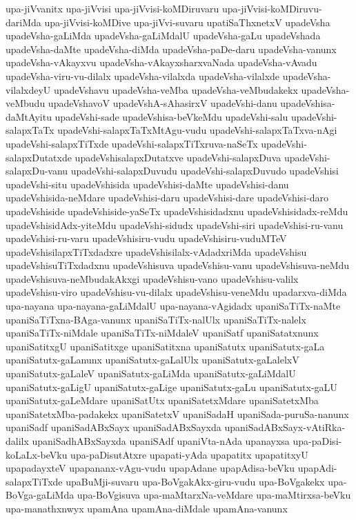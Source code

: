 {upa-jiVvanitx
upa-jiVvisi
upa-jiVvisi-koMDiruvaru
upa-jiVvisi-koMDiruvu-dariMda
upa-jiVvisi-koMDive
upa-jiVvi-suvaru
upatiSaThxnetxV
upadeVsha
upadeVsha-gaLiMda
upadeVsha-gaLiMdalU
upadeVsha-gaLu
upadeVshada
upadeVsha-daMte
upadeVsha-diMda
upadeVsha-paDe-daru
upadeVsha-vanunx
upadeVsha-vAkayxvu
upadeVsha-vAkayxsharxvaNada
upadeVsha-vAvadu
upadeVsha-viru-vu-dilalx
upadeVsha-vilalxda
upadeVsha-vilalxde
upadeVsha-vilalxdeyU
upadeVshavu
upadeVsha-veMba
upadeVsha-veMbudakekx
upadeVsha-veMbudu
upadeVshavoV
upadeVshA-sAhasirxV
upadeVshi-danu
upadeVshisa-daMtAyitu
upadeVshi-sade
upadeVshisa-beVkeMdu
upadeVshi-salu
upadeVshi-salapxTaTx
upadeVshi-salapxTaTxMtAgu-vudu
upadeVshi-salapxTaTxva-nAgi
upadeVshi-salapxTiTxde
upadeVshi-salapxTiTxruva-naSeTx
upadeVshi-salapxDutatxde
upadeVshisalapxDutatxve
upadeVshi-salapxDuva
upadeVshi-salapxDu-vanu
upadeVshi-salapxDuvudu
upadeVshi-salapxDuvudo
upadeVshisi
upadeVshi-situ
upadeVshisida
upadeVshisi-daMte
upadeVshisi-danu
upadeVshisida-neMdare
upadeVshisi-daru
upadeVshisi-dare
upadeVshisi-daro
upadeVshiside
upadeVshiside-yaSeTx
upadeVshisidadxnu
upadeVshisidadx-reMdu
upadeVshisidAdx-yiteMdu
upadeVshi-sidudx
upadeVshi-siri
upadeVshisi-ru-vanu
upadeVshisi-ru-varu
upadeVshisiru-vudu
upadeVshisiru-vuduMTeV
upadeVshisilapxTiTxdadxre
upadeVshisilalx-vAdadxriMda
upadeVshisu
upadeVshisuTiTxdadxnu
upadeVshisuva
upadeVshisu-vanu
upadeVshisuva-neMdu
upadeVshisuva-neMbudakAkxgi
upadeVshisu-vano
upadeVshisu-valilx
upadeVshisu-viro
upadeVshisu-vu-dilalx
upadeVshisu-veneMdu
upadarxva-diMda
upa-nayana
upa-nayana-gaLiMdalU
upa-nayana-vAgidadx
upaniSaTiTx-naMte
upaniSaTiTxna-BAga-vanunx
upaniSaTiTx-nalUlx
upaniSaTiTx-nalelx
upaniSaTiTx-niMdale
upaniSaTiTx-niMdaleV
upaniSatf
upaniSatatxnunx
upaniSatitxgU
upaniSatitxge
upaniSatitxna
upaniSatutx
upaniSatutx-gaLa
upaniSatutx-gaLanunx
upaniSatutx-gaLalUlx
upaniSatutx-gaLalelxV
upaniSatutx-gaLaleV
upaniSatutx-gaLiMda
upaniSatutx-gaLiMdalU
upaniSatutx-gaLigU
upaniSatutx-gaLige
upaniSatutx-gaLu
upaniSatutx-gaLU
upaniSatutx-gaLeMdare
upaniSatUtx
upaniSatetxMdare
upaniSatetxMba
upaniSatetxMba-padakekx
upaniSatetxV
upaniSadaH
upaniSada-puruSa-nanunx
upaniSadf
upaniSadABxSayx
upaniSadABxSayxda
upaniSadABxSayx-vAtiRka-dalilx
upaniSadhABxSayxda
upaniSAdf
upaniVta-nAda
upanayxsa
upa-paDisi-koLaLx-beVku
upa-paDisutAtxre
upapati-yAda
upapatitx
upapatitxyU
upapadayxteV
upapananx-vAgu-vudu
upapAdane
upapAdisa-beVku
upapAdi-salapxTiTxde
upaBuMji-suvaru
upa-BoVgakAkx-giru-vudu
upa-BoVgakekx
upa-BoVga-gaLiMda
upa-BoVgisuva
upa-maMtarxNa-veMdare
upa-maMtirxsa-beVku
upa-manathxnwyx
upamAna
upamAna-diMdale
upamAna-vanunx
}
